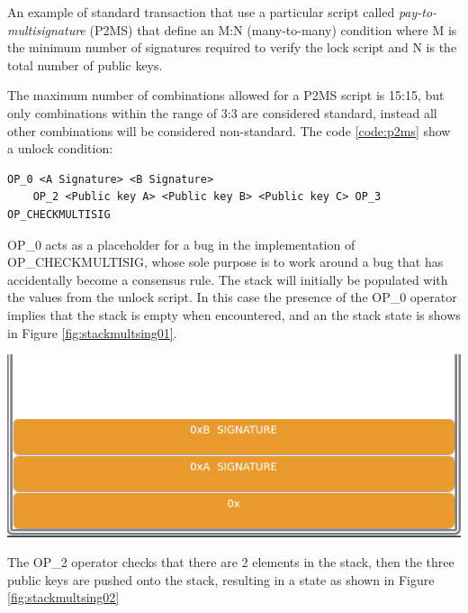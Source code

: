 \begin{example}
    An example of standard transaction that use a particular script called \emph{pay-to-multisignature} (P2MS)
    that define an M:N (many-to-many) condition where M is the minimum number of signatures required 
    to verify the lock script and N is the total number of public keys. 

    The maximum number of combinations allowed for a P2MS script is 15:15, but only 
    combinations within the range of 3:3 are considered standard, instead all other combinations 
    will be considered non-standard. The code \ref{code:p2ms} show a unlock condition:

    \begin{lstlisting}[language=bitcoinscript, caption={Full example of pay-to-multisignature script.}, label={code:p2ms}]
    OP_0 <A Signature> <B Signature>
    OP_2 <Public key A> <Public key B> <Public key C> OP_3 OP_CHECKMULTISIG
    \end{lstlisting}

    OP\_0 acts as a placeholder for a bug in the implementation of OP\_CHECKMULTISIG, 
    whose sole purpose is to work around a bug that has accidentally become a consensus rule. The stack 
    will initially be populated with the values from the unlock script.
    In this case the presence of the OP\_0 operator implies that the stack is empty when encountered, and 
    an the stack state is shows in Figure \ref{fig:stackmultsing01}.

    {\centering
    \vspace{15pt}
    \includegraphics[scale=0.35]{imgs/script/multisig/1.png}
    \vspace{10pt}
    \par}

    The OP\_2 operator checks that there are 2 elements in the stack, then the three 
    public keys are pushed onto the stack, resulting in a state as shown in Figure \ref{fig:stackmultsing02}


\end{example}
